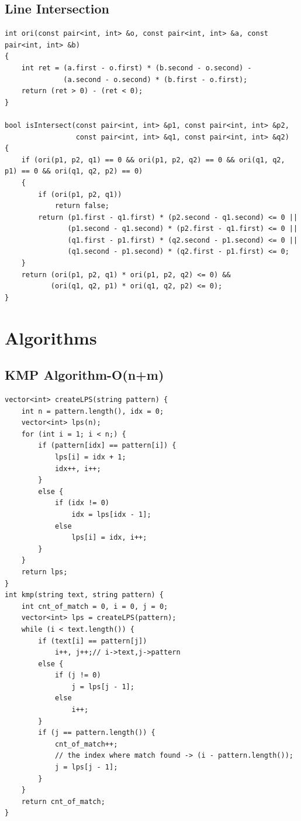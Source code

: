 \subsection{Line Intersection}
\begin{lstlisting}
int ori(const pair<int, int> &o, const pair<int, int> &a, const pair<int, int> &b)
{
    int ret = (a.first - o.first) * (b.second - o.second) -
              (a.second - o.second) * (b.first - o.first);
    return (ret > 0) - (ret < 0);
}

bool isIntersect(const pair<int, int> &p1, const pair<int, int> &p2,
                 const pair<int, int> &q1, const pair<int, int> &q2)
{
    if (ori(p1, p2, q1) == 0 && ori(p1, p2, q2) == 0 && ori(q1, q2, p1) == 0 && ori(q1, q2, p2) == 0)
    {
        if (ori(p1, p2, q1))
            return false;
        return (p1.first - q1.first) * (p2.second - q1.second) <= 0 ||
               (p1.second - q1.second) * (p2.first - q1.first) <= 0 ||
               (q1.first - p1.first) * (q2.second - p1.second) <= 0 ||
               (q1.second - p1.second) * (q2.first - p1.first) <= 0;
    }
    return (ori(p1, p2, q1) * ori(p1, p2, q2) <= 0) &&
           (ori(q1, q2, p1) * ori(q1, q2, p2) <= 0);
}
\end{lstlisting}
\section{Algorithms}
\subsection{KMP Algorithm-O(n+m)}
\begin{lstlisting}
vector<int> createLPS(string pattern) {
    int n = pattern.length(), idx = 0;
    vector<int> lps(n);
    for (int i = 1; i < n;) {
        if (pattern[idx] == pattern[i]) {
            lps[i] = idx + 1;
            idx++, i++;
        }
        else {
            if (idx != 0)
                idx = lps[idx - 1];
            else
                lps[i] = idx, i++;
        }
    }
    return lps;
}
int kmp(string text, string pattern) {
    int cnt_of_match = 0, i = 0, j = 0;
    vector<int> lps = createLPS(pattern);
    while (i < text.length()) {
        if (text[i] == pattern[j])
            i++, j++;// i->text,j->pattern
        else {
            if (j != 0)
                j = lps[j - 1];
            else
                i++;
        }
        if (j == pattern.length()) {
            cnt_of_match++;
            // the index where match found -> (i - pattern.length());
            j = lps[j - 1];
        }
    }
    return cnt_of_match;
}
\end{lstlisting}
